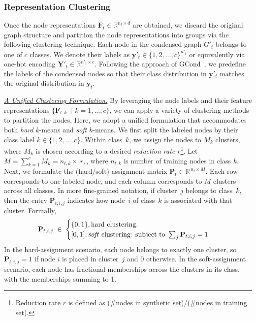 \subsubsection{Representation Clustering}
Once the node representations \(\mathbf{F}_t \in \mathbb{R}^{n_t \times d}\) are obtained, we discard the original graph structure and partition the node representations into groups via the following clustering technique. Each node in the condensed graph \(G'_t\) belongs to one of \(c\) classes. We denote their labels as \(\mathbf{y}'_t \in \{1, 2, \dots, c\}^{n'_t}\) or equivalently via one-hot encoding \(\mathbf{Y}'_t \in \mathbb{R}^{n'_t \times c}\). Following the approach of GCond~\citep{jin2021graph}, we predefine the labels of the condensed nodes so that their class distribution in \(\mathbf{y}'_t\) matches the original distribution in \(\mathbf{y}_t\).

\textit{\underline{A Unified Clustering Formulation.}}
By leveraging the node labels and their feature representations \(\{\mathbf{F}_{t,k}\,\mid\,k=1,\dots,c\}\), we can apply a variety of clustering methods to partition the nodes. Here, we adopt a unified formulation that accommodates both \emph{hard} \(k\)-means and \emph{soft} \(k\)-means. We first split the labeled nodes by their class label \(k\in\{1,2,\dots,c\}\).  
Within class~\(k\), we assign the nodes to \(M_k\) clusters, where \(M_k\) is chosen according to a desired \emph{reduction rate $r$}\footnote{Reduction rate $r$ is defined as (\#nodes in synthetic set)/(\#nodes in training set).}.
Let $M=\sum_{k=1}^{c} M_k=n_{t,k}\times\ r,$, where $n_{t,k}$ is number of training nodes in class $k$. 
Next, we formulate the (hard/soft) assignment matrix \(\mathbf{P}_t \in \mathbb{R}^{\,n_t \times M}\).  Each row corresponds to one labeled node, and each column corresponds to \(M\) clusters across all classes.  In more fine-grained notation, if cluster~\(j\) belongs to class~\(k\), then the entry \(\mathbf{P}_{t,i,j}\) indicates how node~\(i\) of class~\(k\) is associated with that cluster. Formally,
\begin{equation}
\mathbf{P}_{t,i,j} \;\in\;
\begin{cases}
\{0,1\},  \text{hard clustering}.\\
[0,1],  \text{\emph{soft} clustering: subject to }\sum_{j}\mathbf{P}_{t,i,j} = 1.
\end{cases}
\end{equation}
In the hard-assignment scenario, each node belongs to exactly one cluster, so \(\mathbf{P}_{t,i,j} = 1\) if node \(i\) is placed in cluster~\(j\) and \(0\) otherwise. In the soft-assignment scenario, each node has fractional memberships across the clusters in its class, with the memberships summing to 1.

